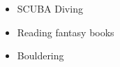 %
%
%

\twocolumnsection
{
\begin{skills}
\end{skills}}
{
\vspace{1em}
\begin{itemize}
	\item SCUBA Diving
	\item Reading fantasy books                    
    \item Bouldering
\end{itemize}
}
